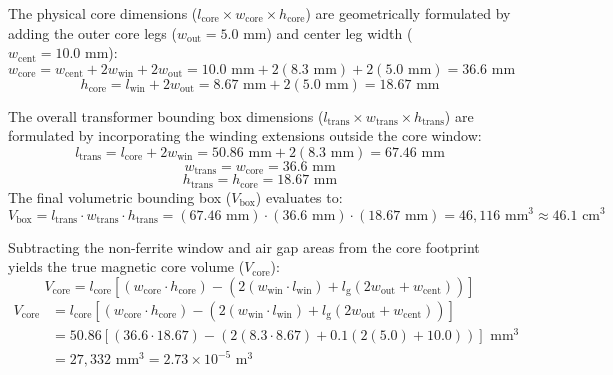The physical core dimensions ($l_{\mathrm{core}} \times w_{\mathrm{core}} \times h_{\mathrm{core}}$) are geometrically formulated by adding the outer core legs ($w_{\mathrm{out}} = 5.0 \text{ mm}$) and center leg width ($w_{\mathrm{cent}} = 10.0 \text{ mm}$):
$$w_{\mathrm{core}} = w_{\mathrm{cent}} + 2 w_{\mathrm{win}} + 2 w_{\mathrm{out}} = 10.0 \text{ mm} + 2 (8.3 \text{ mm}) + 2 (5.0 \text{ mm}) = 36.6 \text{ mm}$$
$$h_{\mathrm{core}} = l_{\mathrm{win}} + 2 w_{\mathrm{out}} = 8.67 \text{ mm} + 2 (5.0 \text{ mm}) = 18.67 \text{ mm}$$

The overall transformer bounding box dimensions ($l_{\mathrm{trans}} \times w_{\mathrm{trans}} \times h_{\mathrm{trans}}$) are formulated by incorporating the winding extensions outside the core window:
$$l_{\mathrm{trans}} = l_{\mathrm{core}} + 2 w_{\mathrm{win}} = 50.86 \text{ mm} + 2 (8.3 \text{ mm}) = 67.46 \text{ mm}$$
$$w_{\mathrm{trans}} = w_{\mathrm{core}} = 36.6 \text{ mm}$$
$$h_{\mathrm{trans}} = h_{\mathrm{core}} = 18.67 \text{ mm}$$
The final volumetric bounding box ($V_{\mathrm{box}}$) evaluates to:
$$V_{\mathrm{box}} = l_{\mathrm{trans}} \cdot w_{\mathrm{trans}} \cdot h_{\mathrm{trans}} = (67.46 \text{ mm}) \cdot (36.6 \text{ mm}) \cdot (18.67 \text{ mm}) = 46,116 \text{ mm}^3 \approx 46.1 \text{ cm}^3$$

Subtracting the non-ferrite window and air gap areas from the core footprint yields the true magnetic core volume ($V_{\mathrm{core}}$):
$$V_{\mathrm{core}} = l_{\mathrm{core}} \left[ (w_{\mathrm{core}} \cdot h_{\mathrm{core}}) - \left( 2(w_{\mathrm{win}} \cdot l_{\mathrm{win}}) + l_{\mathrm{g}}(2 w_{\mathrm{out}} + w_{\mathrm{cent}}) \right) \right]$$
$$ \begin{aligned}
    V_{\mathrm{core}} &= l_{\mathrm{core}} \left[ (w_{\mathrm{core}} \cdot h_{\mathrm{core}}) - \left( 2(w_{\mathrm{win}} \cdot l_{\mathrm{win}}) + l_{\mathrm{g}}(2 w_{\mathrm{out}} + w_{\mathrm{cent}}) \right) \right] \\
    &= 50.86 \left[ (36.6 \cdot 18.67) - \left( 2(8.3 \cdot 8.67) + 0.1(2(5.0) + 10.0) \right) \right] \text{ mm}^3 \\
    &= 27,332 \text{ mm}^3 = 2.73 \times 10^{-5} \text{ m}^3
\end{aligned} $$

